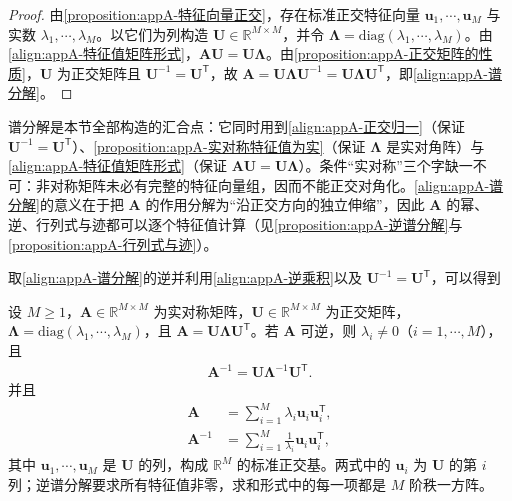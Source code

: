 \documentclass[../main.tex]{subfiles}
\begin{document}
\begin{proof}
由\cref{proposition:appA-特征向量正交}，存在标准正交特征向量 $\bm{u}_1,\cdots,\bm{u}_M$ 与实数 $\lambda_1,\cdots,\lambda_M$。以它们为列构造 $\bm{U}\in\mathbb{R}^{M\times M}$，并令 $\bm{\Lambda}=\mathrm{diag}(\lambda_1,\cdots,\lambda_M)$。由\eqref{align:appA-特征值矩阵形式}，$\bm{A}\bm{U}=\bm{U}\bm{\Lambda}$。由\cref{proposition:appA-正交矩阵的性质}，$\bm{U}$ 为正交矩阵且 $\bm{U}^{-1}=\bm{U}^{\mathsf{T}}$，故 $\bm{A}=\bm{U}\bm{\Lambda}\bm{U}^{-1}=\bm{U}\bm{\Lambda}\bm{U}^{\mathsf{T}}$，即\eqref{align:appA-谱分解}。
\end{proof}

\begin{remark}
谱分解是本节全部构造的汇合点：它同时用到\eqref{align:appA-正交归一}（保证 $\bm{U}^{-1}=\bm{U}^{\mathsf{T}}$）、\cref{proposition:appA-实对称特征值为实}（保证 $\bm{\Lambda}$ 是实对角阵）与\eqref{align:appA-特征值矩阵形式}（保证 $\bm{A}\bm{U}=\bm{U}\bm{\Lambda}$）。条件“实对称”三个字缺一不可：非对称矩阵未必有完整的特征向量组，因而不能正交对角化。\eqref{align:appA-谱分解}的意义在于把 $\bm{A}$ 的作用分解为“沿正交方向的独立伸缩”，因此 $\bm{A}$ 的幂、逆、行列式与迹都可以逐个特征值计算（见\cref{proposition:appA-逆谱分解}与\cref{proposition:appA-行列式与迹}）。
\end{remark}

取\eqref{align:appA-谱分解}的逆并利用\eqref{align:appA-逆乘积}以及 $\bm{U}^{-1}=\bm{U}^{\mathsf{T}}$，可以得到
\begin{proposition}[逆矩阵的谱分解与求和形式]\label{proposition:appA-逆谱分解}
设 $M\geqslant1$，$\bm{A}\in\mathbb{R}^{M\times M}$ 为实对称矩阵，$\bm{U}\in\mathbb{R}^{M\times M}$ 为正交矩阵，$\bm{\Lambda}=\mathrm{diag}(\lambda_1,\cdots,\lambda_M)$，且 $\bm{A}=\bm{U}\bm{\Lambda}\bm{U}^{\mathsf{T}}$。若 $\bm{A}$ 可逆，则 $\lambda_i\neq0$（$i=1,\cdots,M$），且
\begin{align}
  \bm{A}^{-1}=\bm{U}\bm{\Lambda}^{-1}\bm{U}^{\mathsf{T}}.
  \label{align:appA-逆谱分解}
\end{align}
并且
\begin{align}
  \bm{A}&=\sum_{i=1}^{M}\lambda_i\bm{u}_i\bm{u}_i^{\mathsf{T}},
  \label{align:appA-求和形式}\\
  \bm{A}^{-1}&=\sum_{i=1}^{M}\frac{1}{\lambda_i}\bm{u}_i\bm{u}_i^{\mathsf{T}},
  \label{align:appA-逆求和形式}
\end{align}
其中 $\bm{u}_1,\cdots,\bm{u}_M$ 是 $\bm{U}$ 的列，构成 $\mathbb{R}^{M}$ 的标准正交基。两式中的 $\bm{u}_i$ 为 $\bm{U}$ 的第 $i$ 列；逆谱分解要求所有特征值非零，求和形式中的每一项都是 $M$ 阶秩一方阵。
\end{proposition}
\end{document}

